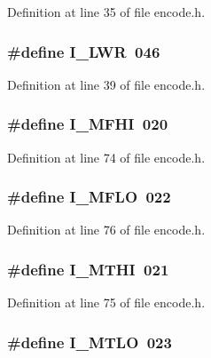 Definition at line 35 of file encode.\+h.

\subsubsection[{I\+\_\+\+L\+WR}]{\setlength{\rightskip}{0pt plus 5cm}\#define I\+\_\+\+L\+WR~046}\label{encode_8h_a8ccdd9e9898a1235501b2e25ff09bdd1}


Definition at line 39 of file encode.\+h.

\subsubsection[{I\+\_\+\+M\+F\+HI}]{\setlength{\rightskip}{0pt plus 5cm}\#define I\+\_\+\+M\+F\+HI~020}\label{encode_8h_aeaa1758d463a9f8bf8d25aee98ff2f93}


Definition at line 74 of file encode.\+h.

\subsubsection[{I\+\_\+\+M\+F\+LO}]{\setlength{\rightskip}{0pt plus 5cm}\#define I\+\_\+\+M\+F\+LO~022}\label{encode_8h_a156274bcb3b045751af3bbb6bd309740}


Definition at line 76 of file encode.\+h.

\subsubsection[{I\+\_\+\+M\+T\+HI}]{\setlength{\rightskip}{0pt plus 5cm}\#define I\+\_\+\+M\+T\+HI~021}\label{encode_8h_a88fc617b28502bc3f277f2893b30fab6}


Definition at line 75 of file encode.\+h.

\subsubsection[{I\+\_\+\+M\+T\+LO}]{\setlength{\rightskip}{0pt plus 5cm}\#define I\+\_\+\+M\+T\+LO~023}\label{encode_8h_a227ca45fe82a73174da18951a311fc59}


